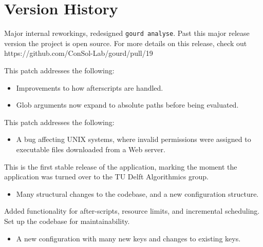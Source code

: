 \pagebreak

\section{Version History}



Major internal reworkings, redesigned \texttt{gourd analyse}.
Past this major release version the project is open source.
For more details on this release, check out https://github.com/ConSol-Lab/gourd/pull/19


This patch addresses the following:
\begin{itemize}
\item Improvements to how afterscripts are handled.
\item Glob arguments now expand to absolute paths
      before being evaluated.
\end{itemize}


This patch addresses the following:
\begin{itemize}
\item A bug affecting UNIX systems, where invalid
      permissions were assigned to executable files
      downloaded from a Web server.
\end{itemize}


This is the first stable release of the application,
marking the moment the application was turned over
to the TU Delft Algorithmics group.

\breakingchanges
\begin{itemize}
\item Many structural changes to the codebase, and a
  new configuration structure.
\end{itemize}


Added functionality for after-scripts, resource limits,
and incremental scheduling.
Set up the codebase for maintainability.

\breakingchanges
\begin{itemize}
\item A new configuration with many new keys and
changes to existing keys.
\end{itemize}

